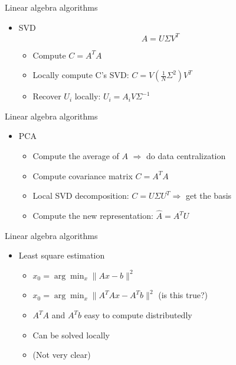 \documentclass[12pt]{beamer}
\begin{document}
\begin{frame}{Linear algebra algorithms}
    \begin{itemize}
        \item SVD
        \[A = U \Sigma V^T \]
        \begin{itemize}
            \item Compute $C = A^TA$
            \item Locally compute C's SVD: $C = V(\frac{1}{N}\Sigma^2)V^T$
            \item Recover $U_i$ locally: $U_i = A_iV\Sigma^{-1}$
        \end{itemize}
    \end{itemize}
\end{frame}

\begin{frame}{Linear algebra algorithms}
    \begin{itemize}
        \item PCA
        \begin{itemize}
            \item Compute the average of $A$ $\Rightarrow$ do data centralization
            \item Compute covariance matrix $C = A^TA$
            \item Local SVD decomposition: $C = U\Sigma U^T \Rightarrow$ get the basis
            \item Compute the new representation: $\hat{A} = A^TU$
        \end{itemize}
    \end{itemize}
\end{frame}

\begin{frame}{Linear algebra algorithms}
    \begin{itemize}
        \item Least square estimation
        \begin{itemize}
            \item $x_0 = \arg \min_x \lVert Ax - b\rVert^2$
            \item $x_0 = \arg \min_x \lVert A^TAx - A^Tb \rVert^2 $ (is this true?)
            \item $A^TA$ and $A^Tb$ easy to compute distributedly
            \item Can be solved locally
            \item (Not very clear)
        \end{itemize}
    \end{itemize}
\end{frame}
\end{document}
